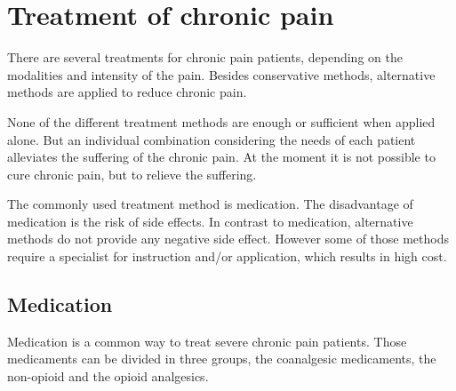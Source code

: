

\section{Treatment of chronic pain}  \label{sec:treatment}
There are several treatments for chronic pain patients, depending on the modalities and intensity of the pain. Besides conservative methods, alternative methods are applied to reduce chronic pain. %
\cite{marcus2009,pope2017}

None of the different treatment methods are enough or sufficient when applied alone. But an individual combination considering the needs of each patient alleviates the suffering of the chronic pain. At the moment it is not possible to cure chronic pain, but to relieve the suffering. \cite{marcus2009,pope2017} 

The commonly used treatment method is medication. The disadvantage of medication is the risk of side effects. In contrast to medication, alternative methods do not provide any negative side effect. However some of those methods require a specialist for instruction and/or application, which results in high cost. \cite{marcus2009,pope2017}

\subsection{Medication}
Medication is a common way to treat severe chronic pain patients. %
Those medicaments can be divided in three groups, the coanalgesic medicaments, the non-opioid and the opioid analgesics. \cite{marcus2009}

